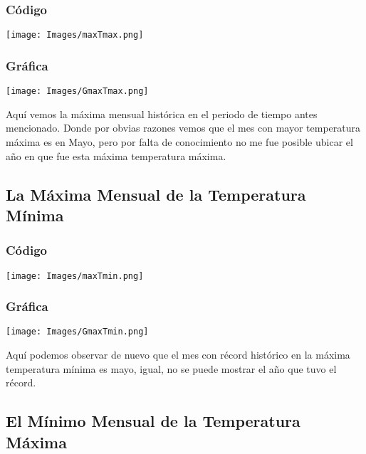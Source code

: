 \documentclass{article}
\begin{document}
\subsubsection{Código}

\begin{center}
    \texttt{[image: Images/maxTmax.png]}
\end{center}

\subsubsection{Gráfica}

\begin{center}
    \texttt{[image: Images/GmaxTmax.png]}
\end{center}
Aquí vemos la máxima mensual histórica en el periodo de tiempo antes mencionado. Donde por obvias razones vemos que el mes con mayor temperatura máxima es en Mayo, pero por falta de conocimiento no me fue posible ubicar el año en que fue esta máxima temperatura máxima.

\subsection{La Máxima Mensual de la Temperatura Mínima}

\subsubsection{Código}

\begin{center}
    \texttt{[image: Images/maxTmin.png]}
\end{center}

\subsubsection{Gráfica}

\begin{center}
    \texttt{[image: Images/GmaxTmin.png]}
\end{center}

Aquí podemos observar de nuevo que el mes con récord histórico en la máxima temperatura mínima es mayo, igual, no se puede mostrar el año que tuvo el récord.

\subsection{El Mínimo Mensual de la Temperatura Máxima}
\end{document}
